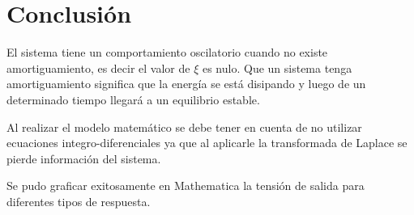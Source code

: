 \documentclass[10pt,a4paper]{article} %
\begin{document}
\section{Conclusión}

El sistema tiene un comportamiento oscilatorio cuando no existe amortiguamiento, es decir el valor de $\xi$ es nulo. Que un sistema tenga amortiguamiento significa que la energía se está disipando y luego de un determinado tiempo llegará a un equilibrio estable.

Al realizar el modelo matemático se debe tener en cuenta de no utilizar ecuaciones integro-diferenciales ya que al aplicarle la transformada de Laplace se pierde información del sistema.
  
Se pudo graficar exitosamente en Mathematica la tensión de salida para diferentes tipos de respuesta.
\end{document}
